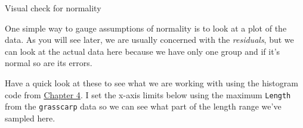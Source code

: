 \documentclass[
]{book}
\newenvironment{Shaded}{\begin{snugshade}}{\end{snugshade}}
\newcommand{\DataTypeTok}[1]{\textcolor[rgb]{0.13,0.29,0.53}{#1}}
\newcommand{\DecValTok}[1]{\textcolor[rgb]{0.00,0.00,0.81}{#1}}
\newcommand{\KeywordTok}[1]{\textcolor[rgb]{0.13,0.29,0.53}{\textbf{#1}}}
\newcommand{\NormalTok}[1]{#1}
\newcommand{\OperatorTok}[1]{\textcolor[rgb]{0.81,0.36,0.00}{\textbf{#1}}}
\newcommand{\StringTok}[1]{\textcolor[rgb]{0.31,0.60,0.02}{#1}}
\begin{document}
Visual check for normality

One simple way to gauge assumptions of normality is to look at a plot of the data. As you will see later, we are usually concerned with the \emph{residuals}, but we can look at the actual data here because we have only one group and if it's normal so are its errors.

Have a quick look at these to see what we are working with using the histogram code from \protect\hyperlink{Chapter4}{Chapter 4}. I set the x-axis limits below using the maximum \texttt{Length} from the \texttt{grasscarp} data so we can see what part of the length range we've sampled here.

\begin{Shaded}
\end{Shaded}
\end{document}
